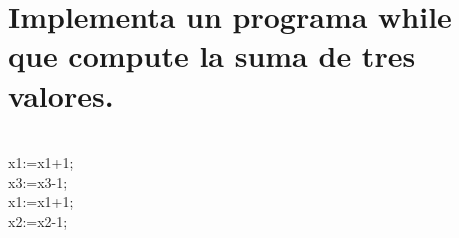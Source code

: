 \documentclass[fleqn, 10pt]{article}
\theoremstyle{plain}
\theoremstyle{definition}
\begin{document}
\section {Implementa un programa while que compute la suma de tres valores.}

\begin{algorithmic}

	\\x1:=x1+1;
	\\x3:=x3-1;
\EndWhile
\\x1:=x1+1;
\\x2:=x2-1;
\EndWhile
\end{algorithmic}
\end{document}
